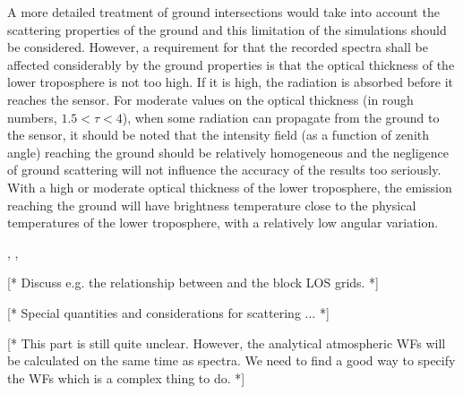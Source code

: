 A more detailed treatment of ground intersections would take into
account the scattering properties of the ground and this limitation of
the simulations should be considered. However, a requirement for that
the recorded spectra shall be affected considerably by the ground
properties is that the optical thickness of the lower troposphere is
not too high. If it is high, the radiation is absorbed before it
reaches the sensor. For moderate values on the optical thickness (in
rough numbers, $1.5<\tau<4$), when some radiation can propagate
from the ground to the sensor, it should be noted that the intensity
field (as a function of zenith angle) reaching the ground should be
relatively homogeneous and the negligence of ground scattering will not
influence the accuracy of the results too seriously. With a high or
moderate optical thickness of the lower troposphere, the emission
reaching the ground will have brightness temperature close to the
physical temperatures of the lower troposphere, with a relatively low
angular variation.



\label{sec:fm_defs:sensor2}

, , 


\label{sec:fm_defs:howtomeasseq}

[* Discuss e.g. the relationship between  and the block LOS grids. *]


\label{sec:fm_defs:scattering}

[* Special quantities and considerations for scattering ... *]



\label{sec:fm_defs:wfs}

[* This part is still quite unclear. However, the analytical
atmospheric WFs will be calculated on the same time as spectra. We
need to find a good way to specify the WFs which is a complex thing to
do. *]


